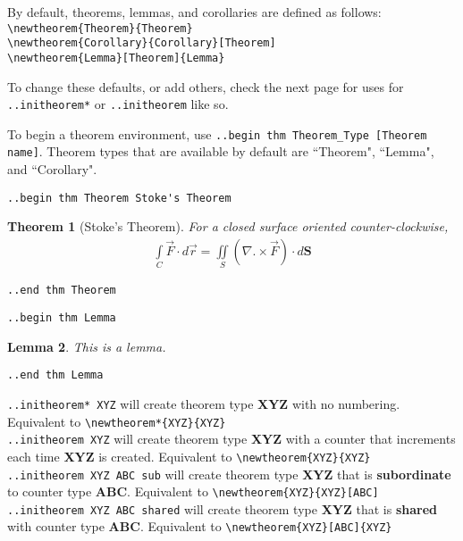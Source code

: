 \documentclass[12pt]{article}
\newtheorem{Theorem}{Theorem}
\newtheorem{Lemma}[Theorem]{Lemma}
\begin{document}
\begin{flushleft}

By default, theorems, lemmas, and corollaries are defined as follows: \\
\verb|\newtheorem{Theorem}{Theorem}|\\
\verb|\newtheorem{Corollary}{Corollary}[Theorem]|\\
\verb|\newtheorem{Lemma}[Theorem]{Lemma}|\\

\bigskip

To change these defaults, or add others, check the next page for uses for \verb|..initheorem*| or \verb|..initheorem| like so.

\bigskip

To begin a theorem environment, use \verb|..begin thm Theorem_Type [Theorem name]|. Theorem types that are available by default are ``Theorem", ``Lemma", and ``Corollary".

\bigskip
\bigskip

\verb|..begin thm Theorem Stoke's Theorem|
\begin{Theorem}[Stoke's Theorem]
For a closed surface oriented counter-clockwise,
\begin{gather*}
\int\limits_C \vec{F} \cdot d\vec{r} = \iint\limits_S (\nabla .\times \vec{F}) \cdot d\textbf{S} 
\end{gather*}
\end{Theorem}
\verb|..end thm Theorem|

\bigskip
\bigskip

\verb|..begin thm Lemma|
\begin{Lemma}
This is a lemma.
\end{Lemma}
\verb|..end thm Lemma|

\newpage

\verb|..initheorem* XYZ| will create theorem type \textbf{XYZ} with no numbering. Equivalent to \verb|\newtheorem*{XYZ}{XYZ}|\\
\verb|..initheorem XYZ| will create theorem type \textbf{XYZ} with a counter that increments each time \textbf{XYZ} is created. Equivalent to \verb|\newtheorem{XYZ}{XYZ}|\\
\verb|..initheorem XYZ ABC sub| will create theorem type \textbf{XYZ} that is \textbf{subordinate} to counter type \textbf{ABC}. Equivalent to \verb|\newtheorem{XYZ}{XYZ}[ABC]|\\
\verb|..initheorem XYZ ABC shared| will create theorem type \textbf{XYZ} that is \textbf{shared} with counter type \textbf{ABC}. Equivalent to \verb|\newtheorem{XYZ}[ABC]{XYZ}|\\

\end{flushleft}
\end{document}
